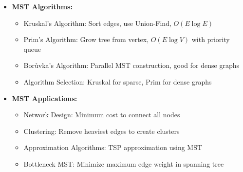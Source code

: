 \documentclass[a4paper,10pt]{book}
\begin{document}
\begin{itemize}[leftmargin=*]
    \item \textbf{MST Algorithms:}
    \begin{itemize}
        \item Kruskal's Algorithm: Sort edges, use Union-Find, $O(E \log E)$
        \item Prim's Algorithm: Grow tree from vertex, $O(E \log V)$ with priority queue
        \item Borůvka's Algorithm: Parallel MST construction, good for dense graphs
        \item Algorithm Selection: Kruskal for sparse, Prim for dense graphs
    \end{itemize}

    \item \textbf{MST Applications:}
    \begin{itemize}
        \item Network Design: Minimum cost to connect all nodes
        \item Clustering: Remove heaviest edges to create clusters
        \item Approximation Algorithms: TSP approximation using MST
        \item Bottleneck MST: Minimize maximum edge weight in spanning tree
    \end{itemize}
\end{itemize}
\end{document}
